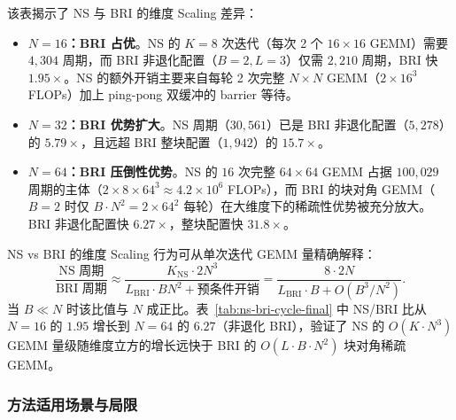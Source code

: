 \documentclass{CjC}
\begin{document}
    该表揭示了 NS 与 BRI 的维度 Scaling 差异：
    \begin{itemize}
        \item \textbf{$N=16$：BRI 占优}。NS 的 $K=8$ 次迭代（每次 2 个 $16\times1
            6$ GEMM）需要 $4,304$ 周期，而 BRI 非退化配置（$B=2,L=3$）仅需 $2,210$
            周期，BRI 快 $1.95\times$。NS 的额外开销主要来自每轮 2 次完整
            $N\times N$ GEMM（$2\times 16^{3}$ FLOPs）加上 ping-pong 双缓冲的 barrier
            等待。

        \item \textbf{$N=32$：BRI 优势扩大}。NS 周期（$30,561$）已是 BRI 非退化配置（$5
            ,278$）的 $5.79\times$，且远超 BRI 整块配置（$1,942$）的
            $15.7\times$。

        \item \textbf{$N=64$：BRI 压倒性优势}。NS 的 $16$ 次完整 $64\times64$ GEMM
            占据 $100,029$ 周期的主体（$2\times 8 \times 64^{3}\approx 4.2\times
            10^{6}$
            FLOPs），而 BRI 的块对角 GEMM（$B=2$ 时仅 $B\cdot N^{2}= 2\times 64^{2}$
            每轮）在大维度下的稀疏性优势被充分放大。BRI 非退化配置快 $6.27\times$，整块配置快
            $31.8\times$。
    \end{itemize}

    NS vs BRI 的维度 Scaling 行为可从单次迭代 GEMM 量精确解释：
    \begin{equation}
        \frac{\text{NS 周期}}{\text{BRI 周期}}\approx \frac{K_{\text{NS}}\cdot 2N^{3}}{L_{\text{BRI}}\cdot
        B N^{2}+ \text{预条件开销}}= \frac{8 \cdot 2N}{L_{\text{BRI}}\cdot B + O(B^{3}/N^{2})}
        .
    \end{equation}
    当 $B \ll N$ 时该比值与 $N$ 成正比。表~\ref{tab:ns-bri-cycle-final} 中 NS/BRI
    比从 $N=16$ 的 $1.95$ 增长到 $N=64$ 的 $6.27$（非退化 BRI），验证了 NS 的 $O(
    K\cdot N^{3})$ GEMM 量级随维度立方的增长远快于 BRI 的 $O(L\cdot B\cdot N^{2})$
    块对角稀疏 GEMM。

    \subsubsection{方法适用场景与局限}
\end{document}

